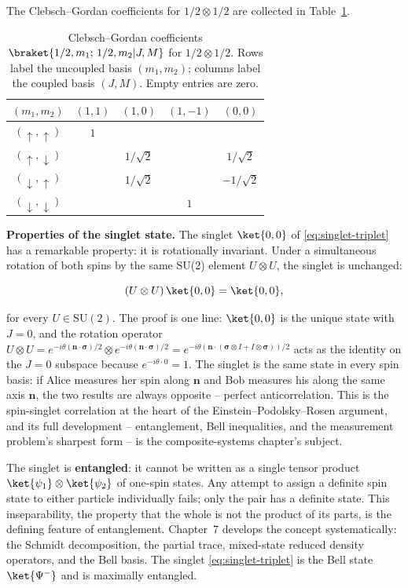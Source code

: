 The Clebsch--Gordan coefficients for $1/2 \otimes 1/2$ are collected in Table~\ref{tab:cg-half-half}.

\begin{table}[htbp]
  \centering
  \caption{Clebsch--Gordan coefficients $\braket{1/2,m_1;\,1/2,m_2|J,M}$ for $1/2 \otimes 1/2$. Rows label the uncoupled basis $(m_1,m_2)$; columns label the coupled basis $(J,M)$. Empty entries are zero.}
  \label{tab:cg-half-half}
  \begin{tabular}{c|cccc}
    $(m_1,m_2)$ & $(1,1)$ & $(1,0)$ & $(1,-1)$ & $(0,0)$ \\
    \hline
    $(\uparrow,\uparrow)$   & $1$ & & & \\
    $(\uparrow,\downarrow)$ & & $1/\sqrt{2}$ & & $1/\sqrt{2}$ \\
    $(\downarrow,\uparrow)$ & & $1/\sqrt{2}$ & & $-1/\sqrt{2}$ \\
    $(\downarrow,\downarrow)$ & & & $1$ & \\
  \end{tabular}
\end{table}

\medskip\noindent\textbf{Properties of the singlet state.}
The singlet $\ket{0,0}$ of \eqref{eq:singlet-triplet} has a remarkable property: it is rotationally invariant. Under a simultaneous rotation of both spins by the same SU(2) element $U \otimes U$, the singlet is unchanged:
\begin{linenomath}
  \begin{equation}
    (U \otimes U)\,\ket{0,0} = \ket{0,0},
  \end{equation}
\end{linenomath}
for every $U \in \mathrm{SU}(2)$. The proof is one line: $\ket{0,0}$ is the unique state with $J = 0$, and the rotation operator $U \otimes U = e^{-i\theta(\bm n\cdot\bm\sigma)/2} \otimes e^{-i\theta(\bm n\cdot\bm\sigma)/2} = e^{-i\theta(\bm n\cdot(\bm\sigma\otimes I + I\otimes\bm\sigma))/2}$ acts as the identity on the $J = 0$ subspace because $e^{-i\theta\cdot 0} = 1$. The singlet is the same state in every spin basis: if Alice measures her spin along $\bm n$ and Bob measures his along the same axis $\bm n$, the two results are always opposite -- perfect anticorrelation. This is the spin-singlet correlation at the heart of the Einstein--Podolsky--Rosen argument, and its full development -- entanglement, Bell inequalities, and the measurement problem's sharpest form -- is the composite-systems chapter's subject.

\begin{note}
  The singlet is \textbf{entangled}: it cannot be written as a single tensor product $\ket{\psi_1}\otimes\ket{\psi_2}$ of one-spin states. Any attempt to assign a definite spin state to either particle individually fails; only the pair has a definite state. This inseparability, the property that the whole is not the product of its parts, is the defining feature of entanglement. Chapter~7 develops the concept systematically: the Schmidt decomposition, the partial trace, mixed-state reduced density operators, and the Bell basis. The singlet \eqref{eq:singlet-triplet} is the Bell state $\ket{\Psi^-}$ and is maximally entangled.
\end{note}

